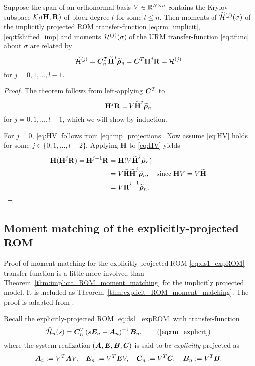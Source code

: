 \bigskip
\begin{theorem}
\label{thm:implicit_ROM_moment_matching}
Suppose the span of an orthonormal basis $V\in\mathbb{R}^{N\times n}$ contains the Krylov-subspace  $\mathcal{K}_{l}({\textbf{\textup{H}}},{\textbf{\textup{R}}})$ of block-degree $l$ for some $l\leq n$.  Then moments of $\widetilde{\mathcal{H}}^{(j)}(\sigma)$ of the implicitly projected ROM transfer-function  \eqref{eq:rm_implicit}, \eqref{eq:tfshifted_imp} and moments $\mathcal{H}^{(j)}(\sigma)$ of the URM transfer-function \eqref{eq:tfunc} about $\sigma$ are related by
\begin{equation}
\widetilde{\mathcal{H}}^{(j)} = \bm{C}_n^T \widetilde{\textbf{\textup{H}}}^j \widetilde{\boldsymbol{\rho}}_n =  \bm{C}^T \textbf{\textup{H}}^j \textbf{\textup{R}} = \mathcal{H}^{(j)}
\end{equation}
for $j=0,1,\ldots,l-1$. 
\end{theorem}

\begin{proof}
The theorem follows from left-applying $\bm{C}^T$ to 
\begin{equation}
\textbf{\textup{H}}^j \textbf{\textup{R}} = V \widetilde{\textbf{\textup{H}}}^j \widetilde{\boldsymbol{\rho}}_n
\label{eq:HV}
\end{equation}
for $j=0,1,\ldots,l-1$, which we will show by induction.  

For $j=0$, \eqref{eq:HV} follows from \eqref{eq:imp_projections}.  Now assume \eqref{eq:HV} holds for some $j\in \{0,1,\ldots,l-2\}$. Applying $\textbf{\textup{H}}$ to \eqref{eq:HV} yields
\begin{align*}
\textbf{\textup{H}}(\textbf{\textup{H}}^j\textbf{\textup{R}}) = \textbf{\textup{H}}^{j+1} \textbf{\textup{R}} &= \textbf{\textup{H}} (V \widetilde{\textbf{\textup{H}}}^j \widetilde{\boldsymbol{\rho}}_n) \\
&= V \widetilde{\textbf{\textup{H}}} \widetilde{\textbf{\textup{H}}}^j \widetilde{\boldsymbol{\rho}}_n, \quad\text{since } \textbf{\textup{H}} V = V \widetilde{\textbf{\textup{H}}} \\
&=  V \widetilde{\textbf{\textup{H}}}^{j+1} \widetilde{\boldsymbol{\rho}}_n.
\end{align*}
      
\end{proof}

\subsection{Moment matching of the explicitly-projected ROM}
 Proof of moment-matching for the explicitly-projected ROM \eqref{eq:ds1_expROM} transfer-function is a little more involved than Theorem~\ref{thm:implicit_ROM_moment_matching} for the implicitly projected model.   It is included as Theorem~\ref{thm:explicit_ROM_moment_matching}.  The proof is adapted from \cite[proposition 6 and theorem 7]{freund2000b}. 

Recall the explicitly-projected ROM \eqref{eq:ds1_expROM} with transfer-function
\[  
\tfexp_n(s) = \CC_n^T\left(s\E_n-\A_n\right)^{-1}\BB_n,
         \tag{\ref{eq:rm_explicit}}
\]
where the system realization $(\bm{A},\bm{E},\bm{B},\bm{C})$ is said to be \emph{explicitly} projected as 
\[
\bm{A}_n := V^T \bm{A} V, \quad \bm{E}_n := V^T \bm{E} V, \quad \bm{C}_n := V^T \bm{C}, \quad \bm{B}_n := V^T\bm{B}.
\]

